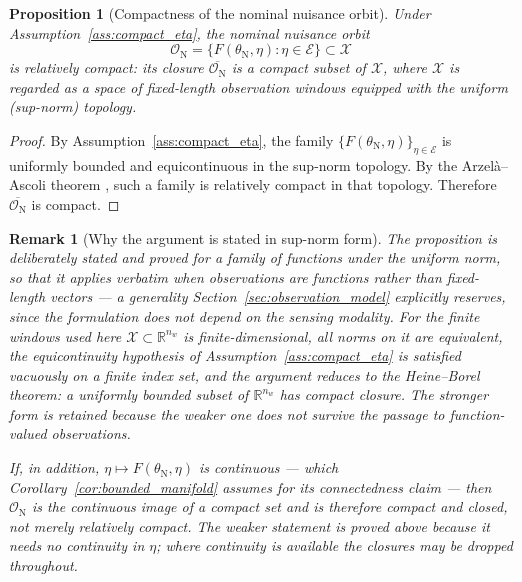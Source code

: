 \documentclass[a4paper]{cas-sc}
\newtheorem{proposition}{Proposition}
\newtheorem{remark}{Remark}
\newcommand{\X}{\ensuremath{\mathcal{X}}}
\newcommand{\EtaSpace}{\ensuremath{\mathcal{E}}}
\newcommand{\R}{\ensuremath{\mathbb{R}}}
\begin{document}
\begin{proposition}[Compactness of the nominal nuisance orbit]
\label{prop:compactness}
Under Assumption~\ref{ass:compact_eta}, the nominal nuisance orbit
\[
\mathcal{O}_{\mathrm N}
=
\bigl\{ F(\theta_{\mathrm N},\eta) : \eta \in \EtaSpace \bigr\}
\subset \X
\]
is relatively compact: its closure \(\overline{\mathcal{O}_{\mathrm N}}\) is
a compact subset of \(\X\), where \(\X\) is regarded as a space of
fixed-length observation windows equipped with the uniform (sup-norm)
topology.
\end{proposition}

\begin{proof}
By Assumption~\ref{ass:compact_eta}, the family
\(\{F(\theta_{\mathrm N},\eta)\}_{\eta\in\EtaSpace}\)
is uniformly bounded and equicontinuous in the sup-norm topology. By the
Arzel\`a--Ascoli theorem \citep[Thm.~7.25]{rudin1976}, such a family is
relatively compact in that topology. Therefore
\(\overline{\mathcal{O}_{\mathrm N}}\) is compact.
\end{proof}

\begin{remark}[Why the argument is stated in sup-norm form]
\label{rem:why_arzela_ascoli}
The proposition is deliberately stated and proved for a family of functions
under the uniform norm, so that it applies verbatim when observations are
functions rather than fixed-length vectors --- a generality
Section~\ref{sec:observation_model} explicitly reserves, since the formulation
does not depend on the sensing modality. For the finite windows used here
\(\X\subset\R^{n_w}\) is finite-dimensional, all norms on it are equivalent,
the equicontinuity hypothesis of Assumption~\ref{ass:compact_eta} is satisfied
vacuously on a finite index set, and the argument reduces to the
Heine--Borel theorem: a uniformly bounded subset of \(\R^{n_w}\) has compact
closure. The stronger form is retained because the weaker one does not survive
the passage to function-valued observations.

If, in addition, \(\eta\mapsto F(\theta_{\mathrm N},\eta)\) is continuous ---
which Corollary~\ref{cor:bounded_manifold} assumes for its connectedness
claim --- then \(\mathcal{O}_{\mathrm N}\) is the continuous image of a compact
set and is therefore compact and closed, not merely relatively compact. The
weaker statement is proved above because it needs no continuity in \(\eta\);
where continuity is available the closures may be dropped throughout.
\end{remark}
\end{document}
